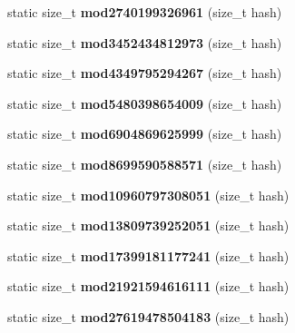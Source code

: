 \begin{DoxyCompactItemize}
\item 
static size\+\_\+t {\bfseries mod2740199326961} (size\+\_\+t hash)\label{structska_1_1prime__number__hash__policy_a796f27ca1ddf0fd16da5feb700f3e9bc}

\item 
static size\+\_\+t {\bfseries mod3452434812973} (size\+\_\+t hash)\label{structska_1_1prime__number__hash__policy_a87d23f8866d3714662ff3cf6dc528413}

\item 
static size\+\_\+t {\bfseries mod4349795294267} (size\+\_\+t hash)\label{structska_1_1prime__number__hash__policy_a21a46e5ede8398becb4f78731c5d194f}

\item 
static size\+\_\+t {\bfseries mod5480398654009} (size\+\_\+t hash)\label{structska_1_1prime__number__hash__policy_a0dba43d09a1f1f1beda5a2e0d4800445}

\item 
static size\+\_\+t {\bfseries mod6904869625999} (size\+\_\+t hash)\label{structska_1_1prime__number__hash__policy_aaadce39c853108f4a1650e1c1fb0e504}

\item 
static size\+\_\+t {\bfseries mod8699590588571} (size\+\_\+t hash)\label{structska_1_1prime__number__hash__policy_ad3c33e3a76e079ff4b879ecaede43dc7}

\item 
static size\+\_\+t {\bfseries mod10960797308051} (size\+\_\+t hash)\label{structska_1_1prime__number__hash__policy_afb652145e8b0e92d5f75bc886ef2a560}

\item 
static size\+\_\+t {\bfseries mod13809739252051} (size\+\_\+t hash)\label{structska_1_1prime__number__hash__policy_ae56f594f8b0adf15401fb7427e083054}

\item 
static size\+\_\+t {\bfseries mod17399181177241} (size\+\_\+t hash)\label{structska_1_1prime__number__hash__policy_acff3919d52a920152b56501a1d520687}

\item 
static size\+\_\+t {\bfseries mod21921594616111} (size\+\_\+t hash)\label{structska_1_1prime__number__hash__policy_ade423084add1fbd6628598d895ad6e7d}

\item 
static size\+\_\+t {\bfseries mod27619478504183} (size\+\_\+t hash)\label{structska_1_1prime__number__hash__policy_aeed533fc80e47c39f33f48f07d5a39a6}


\end{DoxyCompactItemize}
